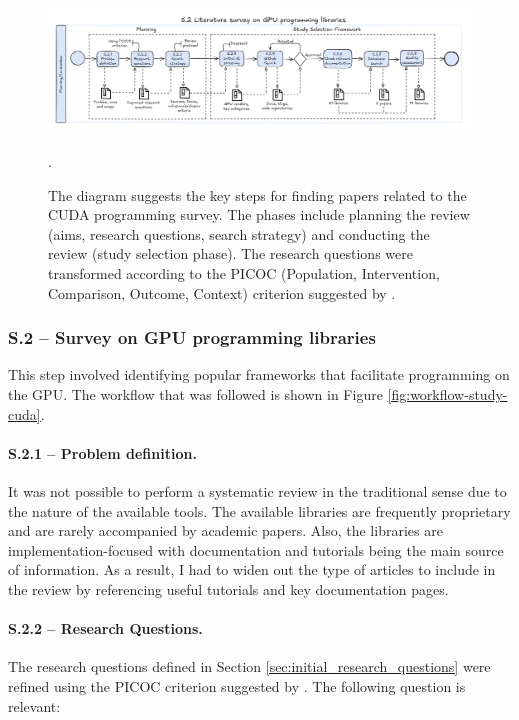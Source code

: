 \begin{figure}[th]
	\centering
	\includegraphics[width=\linewidth]{figures/survey-cuda3.pdf}
	\caption{The diagram suggests the key steps for finding papers related to the CUDA programming survey. The phases
		include planning the review (aims, research questions, search strategy) and conducting the review (study selection phase). The research questions
		were transformed according to the PICOC (Population, Intervention, Comparison, Outcome, Context) criterion suggested by \cite{keele_systematic_2007}.}.
	\label{fig:workflow-study-dnn}
\end{figure}
\subsubsection{S.2 -- Survey on GPU programming libraries}
\label{sec:gpu-programming-libraries}
This step involved identifying popular frameworks that facilitate programming on the GPU. The
workflow that was followed is shown in Figure \ref{fig:workflow-study-cuda}.

\paragraph{S.2.1 -- Problem definition.}
It was not possible to perform a systematic review in the traditional sense due to the nature of
the available tools. The available libraries are frequently proprietary and are rarely accompanied
by academic papers. Also, the libraries are implementation-focused with documentation and tutorials
being the main source of information. As a result, I had to widen out the type of articles to
include in the review by referencing useful tutorials and key documentation pages.

\paragraph{S.2.2 -- Research Questions.}
The research questions defined in Section \ref{sec:initial_research_questions} were refined using
the PICOC criterion suggested by \cite{keele_systematic_2007}. The following question is relevant:

